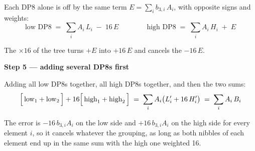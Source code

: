 \documentclass[fleqn]{article}
\begin{document}
\noindent Each DP8 alone is off by the same term $E = \sum_{i} b_{3,i} \, A_i$, with opposite signs
and weights:
\[
\text{low DP8} \;=\; \sum_{i} A_i \, L_i \;-\; 16\,E
\qquad\qquad
\text{high DP8} \;=\; \sum_{i} A_i \, H_i \;+\; E
\]

\noindent The $\times 16$ of the tree turns $+E$ into $+16\,E$ and cancels the $-16\,E$.

\newpage

\noindent\textbf{Step 5 --- adding several DP8s first}

\noindent Adding all low DP8s together, all high DP8s together, and then the two sums:
\[
\Bigl[\, \text{low}_1 + \text{low}_2 \,\Bigr] + 16 \Bigl[\, \text{high}_1 + \text{high}_2 \,\Bigr]
\;=\; \sum_{i} A_i \bigl( L'_i + 16\,H'_i \bigr)
\;=\; \sum_{i} A_i \, B_i
\]

\noindent The error is $-16\,b_{3,i} A_i$ on the low side and $+16\,b_{3,i} A_i$ on the high side for
every element $i$, so it cancels whatever the grouping, as long as both nibbles of each
element end up in the same sum with the high one weighted 16.
\end{document}
